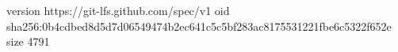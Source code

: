 version https://git-lfs.github.com/spec/v1
oid sha256:0b4cdbed8d5d7d06549474b2ec641c5c5bf283ac8175531221fbe6c5322f652e
size 4791
